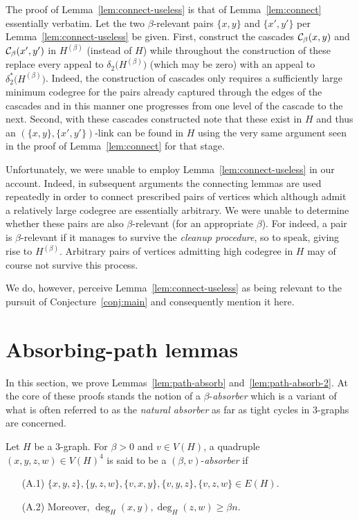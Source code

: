 \documentclass[11pt,reqno]{amsart}
\begin{document}
The proof of Lemma~\ref{lem:connect-useless} is that of Lemma~\ref{lem:connect} essentially verbatim. Let the two $\beta$-relevant pairs $\{x,y\}$ and $\{x',y'\}$ per Lemma~\ref{lem:connect-useless} be given. First, construct the cascades $\mathcal{C}_\beta(x,y)$ and $\mathcal{C}_\beta(x',y')$ in $H^{(\beta)}$ (instead of $H$) while  throughout the construction of these replace every appeal to $\delta_2\big(H^{(\beta)}\big)$ (which may be zero) with an appeal to $\delta^*_2\big(H^{(\beta)}\big)$. Indeed, the construction of cascades only requires a sufficiently large minimum codegree for the pairs already captured through the edges of the cascades and in this manner one progresses from one level of the cascade to the next. Second, with these cascades constructed note that these exist in $H$ and thus an $(\{x,y\},\{x',y'\})$-link can be found in $H$ using the very same argument seen in the proof of Lemma~\ref{lem:connect} for that stage. 

Unfortunately, we were unable to employ Lemma~\ref{lem:connect-useless} in our account. Indeed, in subsequent arguments the connecting lemmas are used repeatedly 
in order to connect prescribed pairs of vertices which although admit a relatively large codegree are essentially arbitrary. We were unable to determine whether these pairs are also $\beta$-relevant (for an appropriate $\beta$). For indeed, a pair is $\beta$-relevant if it manages to survive the {\sl cleanup procedure}, so to speak, giving rise to $H^{(\beta)}$. Arbitrary pairs of vertices admitting high codegree in $H$ may of course not survive this process. 

We do, however, perceive Lemma~\ref{lem:connect-useless} as being relevant to the pursuit of Conjecture~\ref{conj:main} and consequently mention it here. 



\section{Absorbing-path lemmas}\label{sec:absorb}

In this section, we prove Lemmas~\ref{lem:path-absorb} and~\ref{lem:path-absorb-2}. At the core of these proofs stands the notion of a $\beta$-{\sl absorber} which is a variant of what is often referred to as the {\em natural absorber} as far as tight cycles in $3$-graphs are concerned. 

\begin{definition}
Let $H$ be a $3$-graph. For $\beta >0$ and $v \in V(H)$, a quadruple $(x,y,z,w) \in V(H)^4$ is said to be a $(\beta,v)$-{\em absorber} if 
\begin{enumerate}
\item [(A.1)] $
\{x,y,z\},\{y,z,w\}, \{v,x,y\},\{v,y,z\},\{v,z,w\} \in E(H). 
$
\item [(A.2)] Moreover, $\deg_H(x,y),\deg_H(z,w) \geq \beta n$. 
\end{enumerate}
\end{definition}
\end{document}
